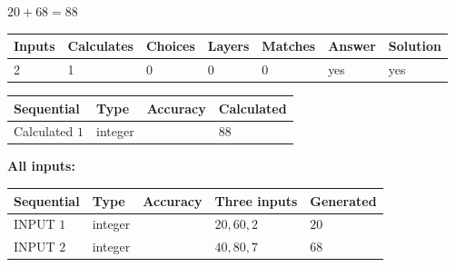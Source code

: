 \documentclass{ctexart}
\begin{document}
 

 
 
 
\noindent{}
 
 

$ %
20 +  %
68=   %
88$
 
 
\noindent{}
 
 

 
   
   
   
   
\noindent\begin{tabular}{|l|l|l|l|l|l|l|}
 \hline
Inputs & Calculates & Choices & Layers & Matches & Answer & Solution \\ \hline
 2  & 
 1  & 
 0
  & 
 0  & 
 0  & 
  yes & 
  yes 
  \\ \hline
 \end{tabular}
   
   
   
   
\noindent{}
   
   
  
  
\noindent\begin{tabular}{|l|l|l|l|}
\hline
 Sequential & Type & Accuracy & Calculated \\ 
\hline
 
 
  Calculated $  1 $ & integer &  & 
  $ 88 $ 
 \\  \hline  
 \end{tabular}
   
   
   
   
\noindent\vspace{0.1in}\hspace{-0.08in} {\textbf{\Large{All inputs: }}}
   
   
  
  
\noindent\begin{tabular}{|l|l|l|l|l|}
\hline
 Sequential & Type & Accuracy & Three inputs & Generated \\ 
\hline
 
 
  INPUT $  1 $ & integer &  & $
 20
 , 
 60
 , 
 2
 $ & $ 20 $ 
 \\  \hline  
 
 
  INPUT $  2 $ & integer &  & $
 40
 , 
 80
 , 
 7
 $ & $ 68 $ 
 \\  \hline  
 \end{tabular}
   
\end{document}
